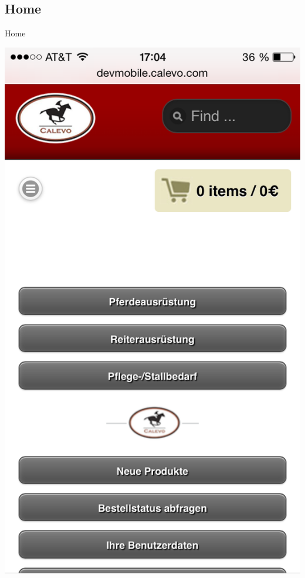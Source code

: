 \subsection{Home}
\begin{frame}{Home}
\begin{center}
  \includegraphics[width=\textwidth,height=1\textheight,keepaspectratio]{pics/home.png}
\end{center}
\end{frame}

